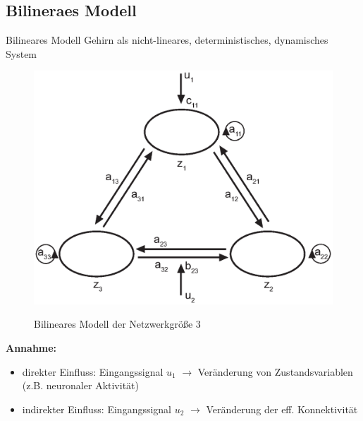 \documentclass{beamer}
\begin{document}
\subsection{Bilineraes Modell}
	\begin{frame}{Bilineares Modell}
		Gehirn als nicht-lineares, deterministisches, dynamisches System 
		\begin{figure}[H]
			\begin{center} \label{fig: bilinearesModell}
				\includegraphics[scale=0.4]{res/bilinearesModell.eps}
				\caption{Bilineares Modell der Netzwerkgröße 3}
			\end{center}
		\end{figure}		
			
		\textbf{Annahme:}
		\begin{itemize}
			\item direkter Einfluss: Eingangssignal $ u_1 $ $ \rightarrow $ Veränderung von Zustandsvariablen (z.B. neuronaler Aktivität)
			\item indirekter Einfluss: Eingangssignal $ u_2 $ $ \rightarrow $ Veränderung der eff. Konnektivität
		\end{itemize}
			
	\end{frame}
	
\end{document}
